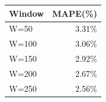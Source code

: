 {\tiny\setlength{\tabcolsep}{2pt}\begin{tabular}{lr} \toprule
Window & MAPE(\%) \\ \midrule
W=50 & 3.31\% \\ 
W=100 & 3.06\% \\ 
W=150 & 2.92\% \\ 
W=200 & 2.67\% \\ 
W=250 & 2.56\% \\ 
\bottomrule \end{tabular}}